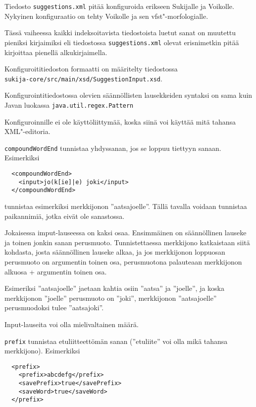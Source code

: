 \documentclass[12pt,a4paper]{scrartcl}
\begin{document}
Tiedosto \verb|suggestions.xml| pitää konfiguroida erikseen
Sukijalle ja Voikolle. Nykyinen konfiguraatio on tehty Voikolle ja sen
vfst"-morfologialle.

Tässä vaiheessa kaikki indeksoitavista tiedostoista luetut sanat on
muutettu pieniksi kirjaimiksi eli tiedostossa
\verb|suggestions.xml| olevat erisnimetkin pitää kirjoittaa
pienellä alkukirjaimella.

Konfiguroititiedoston formaatti on määritelty tiedostossa \\
\verb=sukija-core/src/main/xsd/SuggestionInput.xsd=.

Konfigurointitiedostossa olevien säännöllisten lausekkeiden syntaksi on
sama kuin Javan luokassa \verb=java.util.regex.Pattern=

Konfiguroinnille ei ole käyttöliittymää, koska siinä voi käyttää mitä
tahansa XML"-editoria.




\bigskip
\bigskip
\verb|compoundWordEnd| tunnistaa yhdyssanan, jos se loppuu tiettyyn sanaan.
Esimerkiksi

\begin{verbatim}
  <compoundWordEnd>
    <input>jo(k[ie]|e) joki</input>
  </compoundWordEnd>
\end{verbatim}

tunnistaa esimerkiksi merkkijonon ''aatsajoelle''. Tällä tavalla
voidaan tunnistaa paikannimiä, jotka eivät ole sanastossa.

Jokaisessa imput-lauseessa on kaksi osaa. Ensimmäinen on säännöllinen
lauseke ja toinen jonkin sanan perusmuoto. Tunnistettaessa merkkijono
katkaistaan siitä kohdasta, josta säännöllinen lauseke alkaa, ja jos
merkkijonon loppuosan perusmuoto on argumentin toinen osa,
perusmuotona palauteaan merkkijonon alkuosa + argumentin toinen osa.

Esimeriksi ''aatsajoelle'' jaetaan kahtia osiin ''aatsa'' ja
''joelle'', ja koska merkkijonon ''joelle'' perusmuoto on ''joki'',
merkkijonon ''aatsajoelle'' perusmuodoksi tulee ''aatsajoki''.

Input-lauseita voi olla mielivaltainen määrä.




\bigskip
\verb|prefix| tunnistaa etuliitteettömän sanan (''etuliite'' voi olla
mikä tahansa merkkijono). Esimerkiksi

\begin{verbatim}
  <prefix>
    <prefix>abcdefg</prefix>
    <savePrefix>true</savePrefix>
    <saveWord>true</saveWord>
  </prefix>
\end{verbatim}
\end{document}
